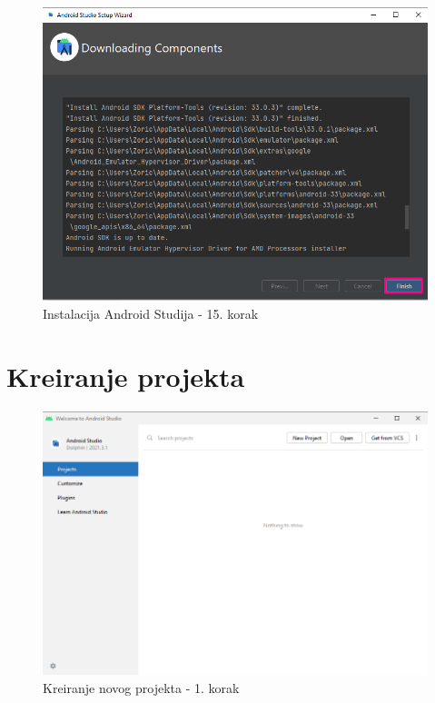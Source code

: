 \documentclass[11pt,a4paper,twoside]{article}
\begin{document}
\begin{figure}[!h]
	\centering
	\includegraphics[width=\textwidth]{install_15.png}
	\caption{Instalacija Android Studija - 15. korak}
	\label{fig:install_15}	
\end{figure}

\section{Kreiranje projekta}

\begin{figure}[!h]
	\centering
	\includegraphics[width=\textwidth]{new_project_01.png}
	\caption{Kreiranje novog projekta - 1. korak}
	\label{fig:new_project_01}	
\end{figure}
\end{document}
